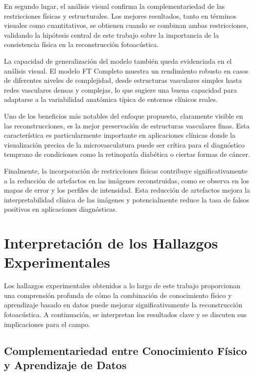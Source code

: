 En segundo lugar, el análisis visual confirma la complementariedad de las restricciones físicas y estructurales. Los mejores resultados, tanto en términos visuales como cuantitativos, se obtienen cuando se combinan ambas restricciones, validando la hipótesis central de este trabajo sobre la importancia de la consistencia física en la reconstrucción fotoacústica.

La capacidad de generalización del modelo también queda evidenciada en el análisis visual. El modelo FT Completo muestra un rendimiento robusto en casos de diferentes niveles de complejidad, desde estructuras vasculares simples hasta redes vasculares densas y complejas, lo que sugiere una buena capacidad para adaptarse a la variabilidad anatómica típica de entornos clínicos reales.

Uno de los beneficios más notables del enfoque propuesto, claramente visible en las reconstrucciones, es la mejor preservación de estructuras vasculares finas. Esta característica es particularmente importante en aplicaciones clínicas donde la visualización precisa de la microvasculatura puede ser crítica para el diagnóstico temprano de condiciones como la retinopatía diabética o ciertas formas de cáncer.

Finalmente, la incorporación de restricciones físicas contribuye significativamente a la reducción de artefactos en las imágenes reconstruidas, como se observa en los mapas de error y los perfiles de intensidad. Esta reducción de artefactos mejora la interpretabilidad clínica de las imágenes y potencialmente reduce la tasa de falsos positivos en aplicaciones diagnósticas.

\section{Interpretación de los Hallazgos Experimentales}

Los hallazgos experimentales obtenidos a lo largo de este trabajo proporcionan una comprensión profunda de cómo la combinación de conocimiento físico y aprendizaje basado en datos puede mejorar significativamente la reconstrucción fotoacústica. A continuación, se interpretan los resultados clave y se discuten sus implicaciones para el campo.

\subsection{Complementariedad entre Conocimiento Físico y Aprendizaje de Datos}

